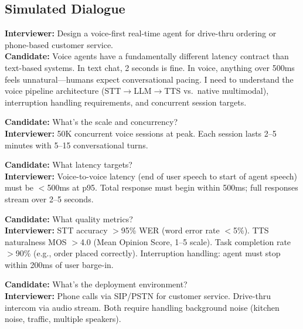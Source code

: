 \subsection*{Simulated Dialogue}
\textbf{Interviewer:} Design a voice-first real-time agent for drive-thru ordering or phone-based customer service.\\
\textbf{Candidate:} Voice agents have a fundamentally different latency contract than text-based systems. In text chat, 2 seconds is fine. In voice, anything over 500ms feels unnatural---humans expect conversational pacing. I need to understand the voice pipeline architecture (STT$\rightarrow$LLM$\rightarrow$TTS vs.\ native multimodal), interruption handling requirements, and concurrent session targets.

\textbf{Candidate:} What's the scale and concurrency?\\
\textbf{Interviewer:} 50K concurrent voice sessions at peak. Each session lasts 2--5 minutes with 5--15 conversational turns.

\textbf{Candidate:} What latency targets?\\
\textbf{Interviewer:} Voice-to-voice latency (end of user speech to start of agent speech) must be $<$500ms at p95. Total response must begin within 500ms; full responses stream over 2--5 seconds.

\textbf{Candidate:} What quality metrics?\\
\textbf{Interviewer:} STT accuracy $>$95\% WER (word error rate $<$5\%). TTS naturalness MOS $>$4.0 (Mean Opinion Score, 1--5 scale). Task completion rate $>$90\% (e.g., order placed correctly). Interruption handling: agent must stop within 200ms of user barge-in.

\textbf{Candidate:} What's the deployment environment?\\
\textbf{Interviewer:} Phone calls via SIP/PSTN for customer service. Drive-thru intercom via audio stream. Both require handling background noise (kitchen noise, traffic, multiple speakers).

